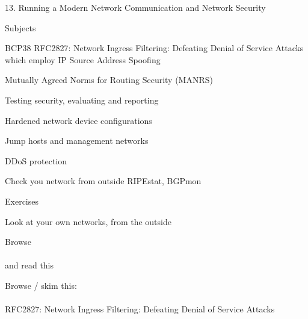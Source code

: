 \documentclass[Screen16to9,17pt]{foils}
\begin{document}
\mytitlepage
{13. Running a Modern Network}
{Communication and Network Security \the\year}



\begin{list1}
\item Subjects
\begin{list2}
\item BCP38 RFC2827: Network Ingress Filtering: Defeating Denial of Service Attacks\\
 which employ IP Source Address Spoofing
\item Mutually Agreed Norms for Routing Security (MANRS)
\item Testing security, evaluating and reporting
\item Hardened network device configurations
\item Jump hosts and management networks
\item DDoS protection
\item Check you network from outside RIPEstat, BGPmon
\end{list2}
\item Exercises
\begin{list2}
\item Look at your own networks, from the outside
\end{list2}
\end{list1}




\begin{list1}
\item Browse\\
\\
and read this\\ {\small{}}
\item Browse / skim this:\\
{\small{}}\\
RFC2827: Network Ingress Filtering: Defeating Denial of Service Attacks
\end{list1}


\end{document}
